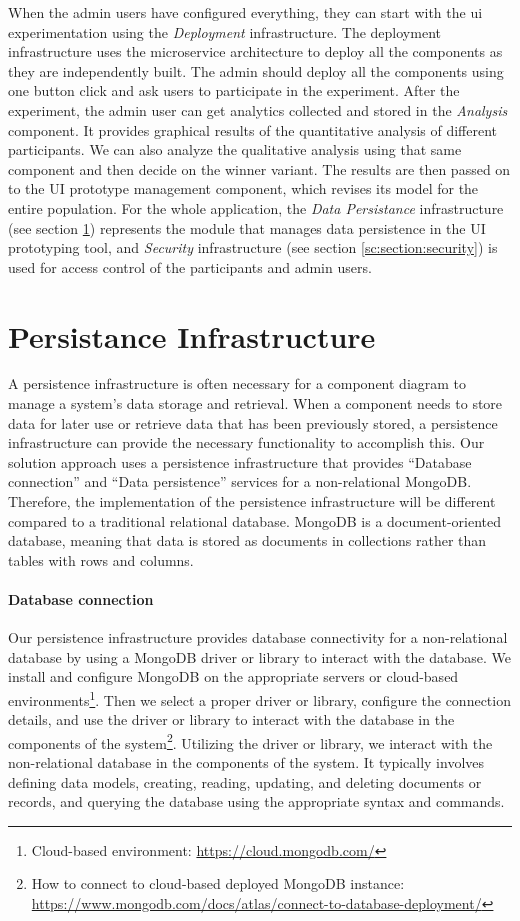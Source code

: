 When the admin users have configured everything, they can start with the \ac{ui} experimentation using the \textit{Deployment} infrastructure. 
The deployment infrastructure uses the microservice architecture to deploy all the components as they are independently built. 
The admin should deploy all the components using one button click and ask users to participate in the experiment. 
After the experiment, the admin user can get analytics collected and stored in the \textit{Analysis} component. 
It provides graphical results of the quantitative analysis of different participants. 
We can also analyze the qualitative analysis using that same component and then decide on the winner variant. 
The results are then passed on to the UI prototype management component, which revises its model for the entire population.  
For the whole application, the \textit{Data Persistance} infrastructure (see section \ref{sc:section:persistance}) represents the module that manages data persistence in the UI prototyping tool, and \textit{Security} infrastructure (see section \ref{sc:section:security}) is used for access control of the participants and admin users.

\clearpage
\section{Persistance Infrastructure}
\label{sc:section:persistance}
A persistence infrastructure is often necessary for a component diagram to manage a system's data storage and retrieval. 
When a component needs to store data for later use or retrieve data that has been previously stored, a persistence infrastructure can provide the necessary functionality to accomplish this.
Our solution approach uses a persistence infrastructure that provides ``Database connection'' and ``Data persistence'' services for a non-relational MongoDB.
Therefore, the implementation of the persistence infrastructure will be different compared to a traditional relational database. 
MongoDB is a document-oriented database, meaning that data is stored as documents in collections rather than tables with rows and columns.

\paragraph{Database connection}
Our persistence infrastructure provides database connectivity for a non-relational database by using a MongoDB driver or library to interact with the database. 
We install and configure MongoDB on the appropriate servers or cloud-based environments\footnote{Cloud-based environment: \url{https://cloud.mongodb.com/}}.
Then we select a proper driver or library, configure the connection details, and use the driver or library to interact with the database in the components of the system\footnote{How to connect to cloud-based deployed MongoDB instance: \url{https://www.mongodb.com/docs/atlas/connect-to-database-deployment/}}.
Utilizing the driver or library, we interact with the non-relational database in the components of the system. It typically involves defining data models, creating, reading, updating, and deleting documents or records, and querying the database using the appropriate syntax and commands.

